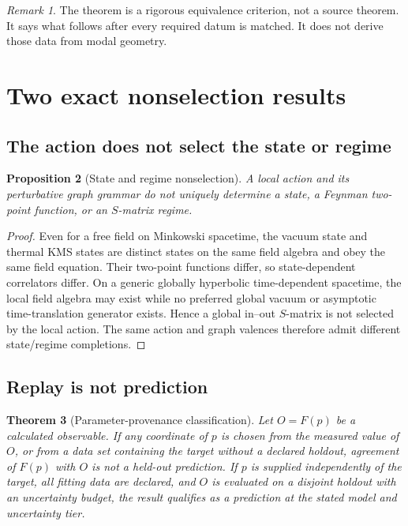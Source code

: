 \documentclass[11pt,a4paper]{article}
\numberwithin{equation}{section}
\newtheorem{theorem}{Theorem}[section]
\newtheorem{proposition}[theorem]{Proposition}
\theoremstyle{definition}
\theoremstyle{remark}
\newtheorem{remark}[theorem]{Remark}
\begin{document}
\begin{remark}
The theorem is a rigorous equivalence criterion, not a source theorem.
It says what follows after every required datum is matched.  It does not
derive those data from modal geometry.
\end{remark}

\section{Two exact nonselection results}

\subsection{The action does not select the state or regime}

\begin{proposition}[State and regime nonselection]
\label{prop:state-nonselection}
A local action and its perturbative graph grammar do not uniquely determine
a state, a Feynman two-point function, or an \(S\)-matrix regime.
\end{proposition}

\begin{proof}
Even for a free field on Minkowski spacetime, the vacuum state and thermal
KMS states are distinct states on the same field algebra and obey the same
field equation.  Their two-point functions differ, so state-dependent
correlators differ.  On a generic globally hyperbolic time-dependent
spacetime, the local field algebra may exist while no preferred global
vacuum or asymptotic time-translation generator exists.  Hence a global
in--out \(S\)-matrix is not selected by the local action.  The same action
and graph valences therefore admit different state/regime completions.
\end{proof}

\subsection{Replay is not prediction}

\begin{theorem}[Parameter-provenance classification]
\label{thm:provenance}
Let \(O=F(p)\) be a calculated observable.  If any coordinate of \(p\) is
chosen from the measured value of \(O\), or from a data set containing the
target without a declared holdout, agreement of \(F(p)\) with \(O\) is not
a held-out prediction.  If \(p\) is supplied independently of the target,
all fitting data are declared, and \(O\) is evaluated on a disjoint
holdout with an uncertainty budget, the result qualifies as a prediction
at the stated model and uncertainty tier.
\end{theorem}
\end{document}
